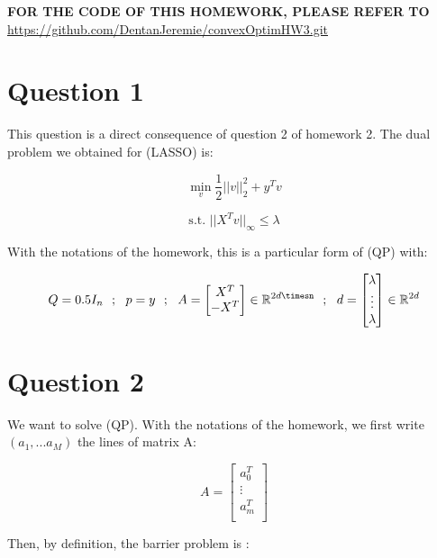 \documentclass[a4paper]{article}
\begin{document}



\begin{center}
    \textbf{FOR THE CODE OF THIS HOMEWORK, PLEASE REFER TO } \url{https://github.com/DentanJeremie/convexOptimHW3.git}
\end{center}

\section{Question 1}

This question is a direct consequence of question 2 of homework 2. The dual problem we obtained for (LASSO) is:

$$
\min_v \frac{1}{2}||v||^2_2 + y^Tv
$$

$$
\text{s.t.  } ||X^Tv||_\infty \le \lambda
$$

With the notations of the homework, this is a particular form of (QP) with:

$$
Q = 0.5 I_n \ \ ; \ \
p = y \ \ ; \ \
A = \begin{bmatrix}
    X^T \\
    -X^T \\
\end{bmatrix} \in \mathbb{R}^{2d\timesn} \ \ ; \ \
d = \begin{bmatrix}
    \lambda \\
    \vdots \\
    \lambda
\end{bmatrix} \in \mathbb{R}^{2d}
$$

\section{Question 2}

We want to solve (QP). With the notations of the homework, we first write $(a_1, ... a_M)$ the lines of matrix A:

$$
A = \begin{bmatrix}
    a_0^T \\
    \vdots \\
    a_m^T \\
\end{bmatrix}
$$

Then, by definition, the barrier problem is :
\end{document}
